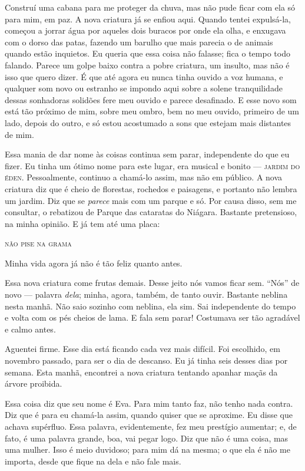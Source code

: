     Construí uma cabana para me proteger da chuva, mas não pude ficar
com ela só para mim, em paz. A nova criatura já se enfiou aqui. Quando tentei
expulsá-la, começou a jorrar água por aqueles dois buracos por onde ela
olha, e enxugava com o dorso das patas, fazendo um barulho que mais parecia o de
animais quando estão inquietos. Eu queria que essa coisa não falasse; fica o
tempo todo falando. Parece um golpe baixo contra a pobre criatura, um
insulto, mas não é isso que quero dizer. É que até agora eu nunca tinha ouvido
a voz humana, e qualquer som novo ou estranho se impondo aqui sobre a solene
tranquilidade dessas sonhadoras solidões fere meu ouvido e parece desafinado. E
esse novo som está tão próximo de mim, sobre meu ombro, bem no meu ouvido,
primeiro de um lado, depois do outro, e só estou acostumado a sons que estejam
mais distantes de mim.

 Essa mania de dar nome às coisas continua sem parar, independente do
que eu fizer. Eu tinha um ótimo nome para este lugar, era musical e bonito ---
\textsc{jardim do éden}. Pessoalmente, continuo a chamá-lo assim, mas não em
público. A nova criatura diz que é cheio de florestas, rochedos e paisagens,
e portanto não lembra um jardim. Diz que se \textit{parece} mais com um parque e só.  
Por causa disso, sem me consultar, o rebatizou de Parque das cataratas do Niágara. 
Bastante pretensioso, na minha opinião. E já tem até uma placa: 

\begin{center}
\textsc{não pise na grama}
\end{center}


Minha vida agora já não é tão feliz quanto antes.

  Essa nova criatura come frutas demais. Desse jeito nós vamos ficar sem.
“Nós” de novo --- palavra \textit{dela}; minha, agora, também, de tanto ouvir. Bastante
neblina nesta manhã. Não saio sozinho com neblina, ela sim. Sai
independente do tempo e volta com os pés cheios de lama. E fala sem parar!
Costumava ser tão agradável e calmo antes.

  Aguentei firme. Esse dia está ficando cada vez mais difícil. Foi
escolhido, em novembro passado, para ser o dia de descanso. Eu já tinha seis
desses dias por semana. Esta manhã, encontrei a nova criatura tentando apanhar
maçãs da árvore proibida.

   Essa coisa diz que seu nome é Eva. Para mim tanto faz, não tenho
nada contra. Diz que é para eu chamá-la assim, quando quiser que se aproxime.
Eu disse que achava supérfluo. Essa palavra, evidentemente, fez meu prestígio
aumentar; e, de fato, é uma palavra grande, boa, vai pegar logo. Diz que não é
uma coisa, mas uma mulher. Isso é meio duvidoso; para mim dá na mesma;
o que ela é não me importa, desde que fique na dela e não fale mais. 

